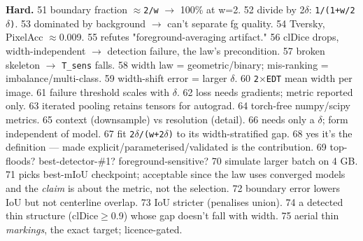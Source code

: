 \documentclass[11pt]{article}
\begin{document}
\textbf{Hard.} 51 boundary fraction \texttt{$\approx$2/w} $\rightarrow$ 100\% at w=2. 52 divide by 2$\delta$: \texttt{1/(1+w/2$\delta$)}. 53 dominated by background $\rightarrow$ can't separate fg quality. 54 Tversky, PixelAcc $\approx$0.009. 55 refutes "foreground-averaging artifact." 56 clDice drops, width-independent $\rightarrow$ detection failure, the law's precondition. 57 broken skeleton $\rightarrow$ \texttt{T\_sens} falls. 58 width law = geometric/binary; mis-ranking = imbalance/multi-class. 59 width-shift error = larger \texttt{$\delta$}. 60 \texttt{2$\times$EDT} mean width per image. 61 failure threshold scales with \texttt{$\delta$}. 62 loss needs gradients; metric reported only. 63 iterated pooling retains tensors for autograd. 64 torch-free numpy/scipy metrics. 65 context (downsample) vs resolution (detail). 66 needs only a \texttt{$\delta$}; form independent of model. 67 fit \texttt{2$\delta$/(w+2$\delta$)} to its width-stratified gap. 68 yes it's the definition --- made explicit/parameterised/validated is the contribution. 69 top-floods? best-detector-\#1? foreground-sensitive? 70 simulate larger batch on 4 GB. 71 picks best-mIoU checkpoint; acceptable since the law uses converged models and the \textit{claim} is about the metric, not the selection. 72 boundary error lowers IoU but not centerline overlap. 73 IoU stricter (penalises union). 74 a detected thin structure (clDice$\geq$0.9) whose gap doesn't fall with width. 75 aerial thin \textit{markings}, the exact target; licence-gated.
\end{document}
